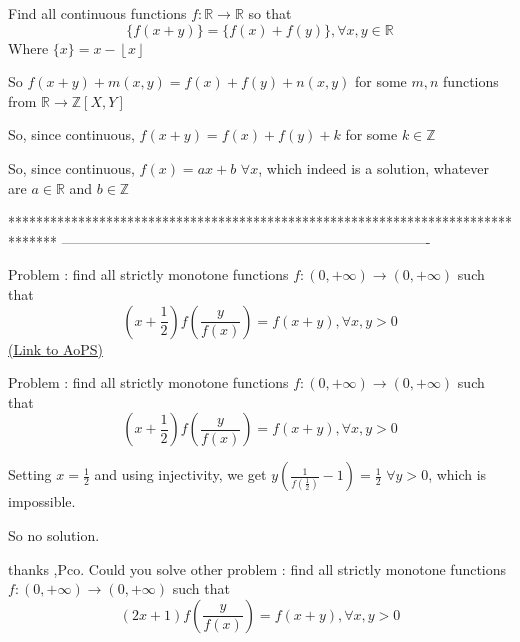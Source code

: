 \begin{solution}
	\begin{tcolorbox}Find all  continuous functions $f:\mathbb{R}\to\mathbb{R}$ so that \[\{f(x+y)\}=\{f(x)+f(y)\},\forall x,y\in\mathbb{R}\]
Where  $\{x\}=x-\left \lfloor x \right \rfloor $\end{tcolorbox}
So $f(x+y)+m(x,y)=f(x)+f(y)+n(x,y)$ for some $m,n$ functions from $\mathbb R\to\mathbb Z[X,Y]$

So, since continuous, $f(x+y)=f(x)+f(y)+k$ for some $k\in\mathbb Z$

So, since continuous, $\boxed{f(x)=ax+b}$ $\forall x$, which indeed is a solution, whatever are $a\in\mathbb R$ and $b\in\mathbb Z$
\end{solution}
*******************************************************************************
-------------------------------------------------------------------------------

\begin{problem}
	Problem : find all strictly monotone functions $f:(0,+\infty)\to(0,+\infty)$ such that
\[\left(x+\frac{1}{2}\right)f\left(\dfrac{y}{f(x)}\right)=f(x+y),\forall x,y>0\]
	\flushright \href{https://artofproblemsolving.com/community/c6h594587}{(Link to AoPS)}
\end{problem}



\begin{solution}
	\begin{tcolorbox}Problem : find all strictly monotone functions $f:(0,+\infty)\to(0,+\infty)$ such that
\[\left(x+\frac{1}{2}\right)f\left(\dfrac{y}{f(x)}\right)=f(x+y),\forall x,y>0\]\end{tcolorbox}
Setting $x=\frac 12$ and using injectivity, we get $y(\frac 1{f(\frac 12)}-1)=\frac 12$ $\forall y>0$, which is impossible.

So no solution.
\end{solution}



\begin{solution}
	thanks ,Pco. Could you solve other problem : find all strictly monotone functions $f:(0,+\infty)\to(0,+\infty)$ such that
\[\left(2x+1\right)f\left(\dfrac{y}{f(x)}\right)=f(x+y),\forall x,y>0\]
\end{solution}



